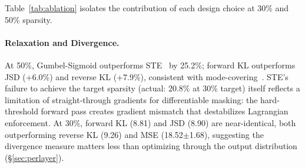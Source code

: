 Table~\ref{tab:ablation} isolates the contribution of each design choice at 30\% and 50\% sparsity.

\begin{table}[t]
\centering
\caption{Ablation on LLaMA-3.1-8B (WikiText-2 PPL$\downarrow$; uniform at 30\%, global at 50\%). $\pm$: 3-seed; unmarked: s42. $^\ddagger$STE: 20.8\% actual sparsity at 30\% target; loss effect ($\Delta$PPL=20.4) is $5.1\times$ relaxation effect ($\Delta$PPL=3.98). $^\S$MSE 50\%: 2/3 seeds collapsed to ${\sim}$5\% actual sparsity; s42 only (Appendix~\ref{app:mse_config}).}
\label{tab:ablation}
\end{table}

\paragraph{Relaxation and Divergence.}
At 50\%, Gumbel-Sigmoid outperforms STE~\cite{bengio2013ste} by 25.2\%; forward KL outperforms JSD (+6.0\%) and reverse KL (+7.9\%), consistent with mode-covering~\cite{gu2024minillm}.
STE's failure to achieve the target sparsity (actual: 20.8\% at 30\% target) itself reflects a limitation of straight-through gradients for differentiable masking: the hard-threshold forward pass creates gradient mismatch that destabilizes Lagrangian enforcement.
At 30\%, forward KL (8.81) and JSD (8.90) are near-identical, both outperforming reverse KL (9.26) and MSE (18.52$\pm$1.68), suggesting the divergence measure matters less than optimizing through the output distribution (\S\ref{sec:perlayer}).
